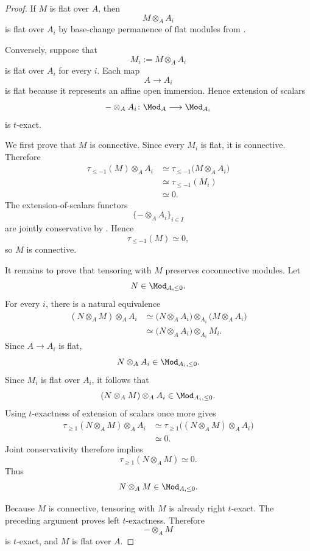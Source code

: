 \begin{proof}
If \(M\) is flat over \(A\), then
\[
    M\otimes_AA_i
\]
is flat over \(A_i\) by base-change permanence of flat modules from
.

Conversely, suppose that
\[
    M_i
    :=
    M\otimes_AA_i
\]
is flat over \(A_i\) for every \(i\). Each map
\[
    A
    \longrightarrow
    A_i
\]
is flat because it represents an affine open immersion. Hence extension
of scalars
\[
    -\otimes_AA_i
    \colon
    \Mod_A
    \longrightarrow
    \Mod_{A_i}
\]
is \(t\)-exact.

We first prove that \(M\) is connective. Since every \(M_i\) is flat, it
is connective. Therefore
\[
\begin{aligned}
    \tau_{\leq-1}(M)\otimes_AA_i
    &\simeq
    \tau_{\leq-1}
    \bigl(
        M\otimes_AA_i
    \bigr)
    \\
    &\simeq
    \tau_{\leq-1}(M_i)
    \\
    &\simeq
    0.
\end{aligned}
\]
The extension-of-scalars functors
\[
    \{-\otimes_AA_i\}_{i\in I}
\]
are jointly conservative by
.
Hence
\[
    \tau_{\leq-1}(M)
    \simeq
    0,
\]
so \(M\) is connective.

It remains to prove that tensoring with \(M\) preserves coconnective
modules. Let
\[
    N
    \in
    \Mod_{A,\leq0}.
\]
For every \(i\), there is a natural equivalence
\[
\begin{aligned}
    (N\otimes_AM)\otimes_AA_i
    &\simeq
    \bigl(
        N\otimes_AA_i
    \bigr)
    \otimes_{A_i}
    \bigl(
        M\otimes_AA_i
    \bigr)
    \\
    &\simeq
    \bigl(
        N\otimes_AA_i
    \bigr)
    \otimes_{A_i}
    M_i.
\end{aligned}
\]
Since \(A\to A_i\) is flat,
\[
    N\otimes_AA_i
    \in
    \Mod_{A_i,\leq0}.
\]
Since \(M_i\) is flat over \(A_i\), it follows that
\[
    (N\otimes_AM)\otimes_AA_i
    \in
    \Mod_{A_i,\leq0}.
\]
Using \(t\)-exactness of extension of scalars once more gives
\[
\begin{aligned}
    \tau_{\geq1}(N\otimes_AM)\otimes_AA_i
    &\simeq
    \tau_{\geq1}
    \bigl(
        (N\otimes_AM)\otimes_AA_i
    \bigr)
    \\
    &\simeq
    0.
\end{aligned}
\]
Joint conservativity therefore implies
\[
    \tau_{\geq1}(N\otimes_AM)
    \simeq
    0.
\]
Thus
\[
    N\otimes_AM
    \in
    \Mod_{A,\leq0}.
\]

Because \(M\) is connective, tensoring with \(M\) is already right
\(t\)-exact. The preceding argument proves left \(t\)-exactness.
Therefore
\[
    -\otimes_AM
\]
is \(t\)-exact, and \(M\) is flat over \(A\).
\end{proof}

